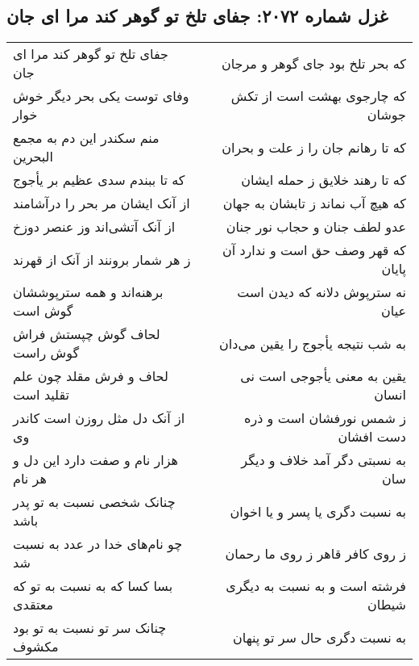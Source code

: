 \begin{center}
\section*{غزل شماره ۲۰۷۲: جفای تلخ تو گوهر کند مرا ای جان}
\label{sec:2072}
\begin{longtable}{l p{0.5cm} r}
جفای تلخ تو گوهر کند مرا ای جان
&&
که بحر تلخ بود جای گوهر و مرجان
\\
وفای توست یکی بحر دیگر خوش خوار
&&
که چارجوی بهشت است از تکش جوشان
\\
منم سکندر این دم به مجمع البحرین
&&
که تا رهانم جان را ز علت و بحران
\\
که تا ببندم سدی عظیم بر یأجوج
&&
که تا رهند خلایق ز حمله ایشان
\\
از آنک ایشان مر بحر را درآشامند
&&
که هیچ آب نماند ز تابشان به جهان
\\
از آنک آتشی‌اند وز عنصر دوزخ
&&
عدو لطف جنان و حجاب نور جنان
\\
ز هر شمار برونند از آنک از قهرند
&&
که قهر وصف حق است و ندارد آن پایان
\\
برهنه‌اند و همه سترپوششان گوش است
&&
نه سترپوش دلانه که دیدن است عیان
\\
لحاف گوش چپستش فراش گوش راست
&&
به شب نتیجه یأجوج را یقین می‌دان
\\
لحاف و فرش مقلد چون علم تقلید است
&&
یقین به معنی یأجوجی است نی انسان
\\
از آنک دل مثل روزن است کاندر وی
&&
ز شمس نورفشان است و ذره دست افشان
\\
هزار نام و صفت دارد این دل و هر نام
&&
به نسبتی دگر آمد خلاف و دیگر سان
\\
چنانک شخصی نسبت به تو پدر باشد
&&
به نسبت دگری یا پسر و یا اخوان
\\
چو نام‌های خدا در عدد به نسبت شد
&&
ز روی کافر قاهر ز روی ما رحمان
\\
بسا کسا که به نسبت به تو که معتقدی
&&
فرشته است و به نسبت به دیگری شیطان
\\
چنانک سر تو نسبت به تو بود مکشوف
&&
به نسبت دگری حال سر تو پنهان
\\
\end{longtable}
\end{center}
